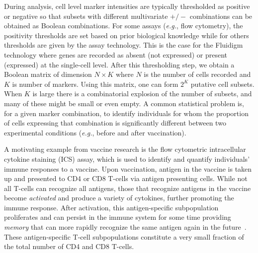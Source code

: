 \documentclass[useAMS,referee,usenatbib]{biom}
\begin{document}
During analysis, cell level marker intensities are typically thresholded as positive or negative so that subsets with different multivariate $+/-$ combinations can be obtained as Boolean combinations. 
For some assays (\textit{e.g.}, flow cytometry), the positivity thresholds are set based on prior biological knowledge while for others thresholds are given by the assay technology. 
This is the case for the Fluidigm technology where genes are recorded as absent (not expressed) or present (expressed) at the single-cell level.
 After this thresholding step, we obtain a Boolean matrix of dimension $N\times K$ where $N$ is the number of cells recorded and $K$ is number of markers. 
Using this matrix, one can form $2^K$ putative cell subsets. 
When $K$ is large there is a combinatorial explosion of the number of subsets, and many of these might be small or even empty. 
A common statistical problem is, for a given marker combination, to identify individuals for whom the proportion of cells expressing that combination is significantly different between two experimental conditions (\textit{e.g.}, before and after vaccination). 

A motivating example from vaccine research is the flow cytometric intracellular cytokine staining (ICS) assay, which is used to identify and quantify individuals' immune responses to a vaccine. Upon vaccination, antigen in the vaccine is taken up and presented to CD4 or CD8 T-cells via antigen presenting cells.
 While not all T-cells can recognize all antigens, those that recognize antigens in the vaccine become \emph{activated} and produce a variety of cytokines, further promoting the immune response. 
 After activation, this antigen-specific subpopulation proliferates and can persist in the immune system for some time providing \emph{memory} that can more rapidly recognize the same antigen again in the future~\citep{McKinstry:2010ei}. 
 These antigen-specific T-cell subpopulations constitute a very small fraction of the total number of CD4 and CD8 T-cells. 
\end{document}

